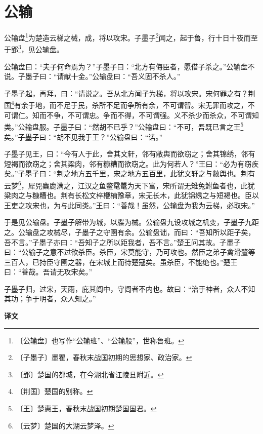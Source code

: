 \documentclass[12pt,UTF-8,openany,a4]{ctexbook}
\begin{document}
\chapter{公输}

\begin{large}
    
    公输盘\footnote{〔公输盘〕\yiwen 也写作“公输班”、“公输般”，世称鲁班。}为楚造云梯之械，成，将以攻宋。子墨子\footnote{〔子墨子〕\yiwen 墨翟，春秋末战国初期的思想家、政治家。}闻之，起于鲁，行十日十夜而至于郢\footnote{〔郢〕\yiwen 楚国的都城，在今湖北省江陵县附近。}，见公输盘。
    
    公输盘曰：“夫子何命焉为？”子墨子曰：“北方有侮臣者，愿借子杀之。”公输盘不说。子墨子曰：“请献十金。”公输盘曰：“吾义固不杀人。”
    
    子墨子起，再拜，曰：“请说之。吾从北方闻子为梯，将以攻宋。宋何罪之有？荆国\footnote{〔荆国〕\yiwen 楚国的别称。}有余于地，而不足于民，杀所不足而争所有余，不可谓智。宋无罪而攻之，不可谓仁。知而不争，不可谓忠。争而不得，不可谓强。义不杀少而杀众，不可谓知类。”公输盘服。子墨子曰：“然胡不已乎？”公输盘曰：“不可，吾既已言之王\footnote{〔王〕\yiwen 楚惠王，春秋末战国初期楚国国君。}矣。”子墨子曰：“胡不见我于王？”公输盘曰：“诺。”
    
    子墨子见王，曰：“今有人于此，舍其文轩，邻有敝舆而欲窃之；舍其锦绣，邻有短褐而欲窃之；舍其粱肉，邻有糠糟而欲窃之。此为何若人？”王曰：“必为有窃疾矣。”子墨子曰：“荆之地方五千里，宋之地方五百里，此犹文轩之与敝舆也。荆有云梦\footnote{〔云梦〕\yiwen 楚国的大湖云梦泽。}，犀兕麋鹿满之，江汉之鱼鳖鼋鼍为天下富，宋所谓无雉兔鲋鱼者也，此犹粱肉之与糠糟也。荆有长松文梓楩楠豫章，宋无长木，此犹锦绣之与短褐也。臣以王吏之攻宋也，为与此同类。”王曰：“善哉！虽然，公输盘为我为云梯，必取宋。”
    
    于是见公输盘。子墨子解带为城，以牒为械。公输盘九设攻城之机变，子墨子九距之。公输盘之攻械尽，子墨子之守圉有余。公输盘诎，而曰：“吾知所以距子矣，吾不言。”子墨子亦曰：“吾知子之所以距我者，吾不言。”楚王问其故。子墨子曰：“公输子之意不过欲杀臣。杀臣，宋莫能守，乃可攻也。然臣之弟子禽滑釐等三百人，已持臣守圉之器，在宋城上而待楚寇矣。虽杀臣，不能绝也。”楚王曰：“善哉。吾请无攻宋矣。”
    
    子墨子归，过宋，天雨，庇其闾中，守闾者不内也。故曰：“治于神者，众人不知其功；争于明者，众人知之。”
\end{large}


\newpage

\begin{Large}
    \noindent\textbf{译文}
\end{Large}
\end{document}
